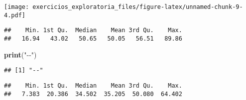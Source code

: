 \documentclass[
]{article}
\newenvironment{Shaded}{\begin{snugshade}}{\end{snugshade}}
\newcommand{\CommentTok}[1]{\textcolor[rgb]{0.56,0.35,0.01}{\textit{#1}}}
\newcommand{\FloatTok}[1]{\textcolor[rgb]{0.00,0.00,0.81}{#1}}
\newcommand{\FunctionTok}[1]{\textcolor[rgb]{0.13,0.29,0.53}{\textbf{#1}}}
\newcommand{\NormalTok}[1]{#1}
\newcommand{\SpecialCharTok}[1]{\textcolor[rgb]{0.81,0.36,0.00}{\textbf{#1}}}
\newcommand{\StringTok}[1]{\textcolor[rgb]{0.31,0.60,0.02}{#1}}
\begin{document}
\begin{Shaded}
\end{Shaded}

\texttt{[image: exercicios\_exploratoria\_files/figure-latex/unnamed-chunk-9-4.pdf]}

\begin{Shaded}
\end{Shaded}

\begin{verbatim}
##    Min. 1st Qu.  Median    Mean 3rd Qu.    Max. 
##   16.94   43.02   50.65   50.05   56.51   89.86
\end{verbatim}

\begin{Shaded}
\begin{Highlighting}[]
\FunctionTok{print}\NormalTok{(}\StringTok{"{-}{-}"}\NormalTok{)}
\end{Highlighting}
\end{Shaded}

\begin{verbatim}
## [1] "--"
\end{verbatim}

\begin{Shaded}
\end{Shaded}

\begin{verbatim}
##    Min. 1st Qu.  Median    Mean 3rd Qu.    Max. 
##   7.383  20.386  34.502  35.205  50.080  64.402
\end{verbatim}

\begin{Shaded}
\end{Shaded}
\end{document}
